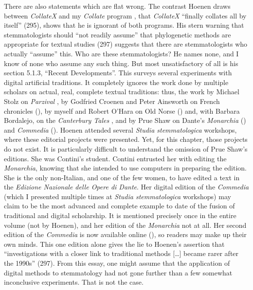 \begin{review}
There are also statements which are flat wrong. The contrast
Hoenen draws between \emph{CollateX} \parencite{dekker_collatex_2010} and my
\emph{Collate} program \parencite{robinson_collate_2014}, that \emph{CollateX} ``finally
collates all by itself'' (295), shows that he is ignorant of both
programs. His stern warning that stemmatologists should ``not readily
assume'' that phylogenetic methods are appropriate for textual studies
(297) suggests that there are stemmatologists who actually ``assume''
this. Who are these stemmatologists? He names none, and I know of none
who assume any such thing. But most unsatisfactory of all is his section
5.1.3, ``Recent Developments''. This surveys several experiments with
digital artificial traditions. It completely ignores the work done by
multiple scholars on actual, real, complete textual traditions: thus,
the work by Michael Stolz on \emph{Parzival} \parencite{von_eschenbach_parzival-projekt_2022}, by
Godfried Croenen and Peter Ainsworth on French chronicles (\citeyear{croenen_online_2010}), by
myself and Robert O'Hara on Old Norse (\citeyear{robinson_report_1992}) and, with Barbara
Bordalejo, on the \emph{Canterbury Tales} \parencite{chaucer_canterbury_1991}, and by Prue
Shaw on Dante's \emph{Monarchia} (\citeyear{alighieri_monarchia_2019}) and \emph{Commedia} (\citeyear{alighieri_commedia_2021}).
Hoenen attended several \emph{Studia stemmatologica} workshops, where
these editorial projects were presented. Yet, for this chapter, those
projects do not exist. It is particularly difficult to understand the
omission of Prue Shaw's editions. She was Contini's student. Contini
entrusted her with editing the \emph{Monarchia}, knowing that she
intended to use computers in preparing the edition. She is the only
non-Italian, and one of the few women, to have edited a text in the
\emph{Edizione Nazionale delle Opere di Dante}. Her digital edition of
the \emph{Commedia} (which I presented multiple times at \emph{Studia
stemmatologica} workshops) may claim to be the most advanced and
complete example to date of the fusion of traditional and digital
scholarship. It is mentioned precisely once in the entire volume (not by
Hoenen), and her edition of the \emph{Monarchia} not at all. Her second
edition of the \emph{Commedia} is now available online (\citeyear{alighieri_commedia_2021}), so
readers may make up their own minds. This one edition alone gives the
lie to Hoenen's assertion that ``investigations with a closer link to
traditional methods [\ldots] became rarer after the 1990s'' (297).
From this essay, one might assume that the application of digital
methods to stemmatology had not gone further than a few somewhat
inconclusive experiments. That is not the case.


\end{review}
